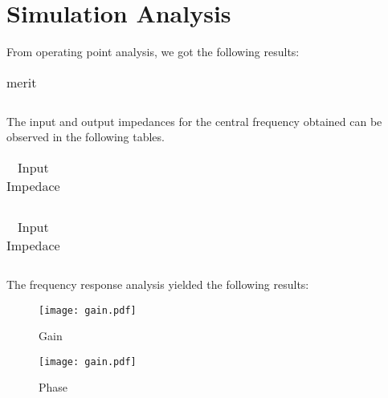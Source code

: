 \section{Simulation Analysis}
\label{sec:simulation} 

From operating point analysis, we got the following results:
\FloatBarrier
\begin{table}[h]
  \centering
  \begin{tabular}{|c|c|c|c|c|}
    \hline    
    
    \hline
  \end{tabular}
  \caption{merit}
  \label{tab:Spice1}
\end{table}
\FloatBarrier  

The input and output impedances for the central frequency obtained can be observed in the following tables.

\FloatBarrier
\begin{table}[h]
  \centering
  \begin{tabular}{|c|c|}
    \hline    
    
    \hline
  \end{tabular}
  \caption{Input Impedace}
  \label{tab:Spice1}
\end{table}
\FloatBarrier 
  
\FloatBarrier
\begin{table}[h]
  \centering
  \begin{tabular}{|c|c|}
    \hline    
    
    \hline
  \end{tabular}
  \caption{Input Impedace}
  \label{tab:Spice1}
\end{table}
\FloatBarrier  

The frequency response analysis yielded the following results:
\begin{figure} [!htb] 
  \texttt{[image: gain.pdf]}
  \caption{Gain}
  \label{fig:theoplots}
  \endminipage\hfill
\end{figure}

\begin{figure} [!htb] 
  \texttt{[image: gain.pdf]}
  \caption{Phase}
  \label{fig:theoplots}
  \endminipage\hfill
\end{figure}



